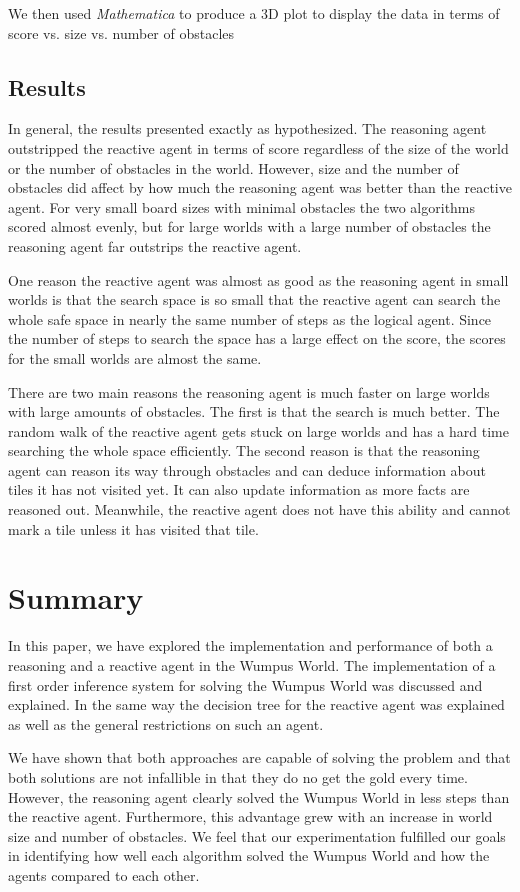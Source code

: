 \documentclass{article}
\begin{document}
	We then used \textit{Mathematica}  to produce a 3D plot to display the data in terms of score vs. size vs. number of obstacles
	
	\subsection{Results}
		In general, the results presented exactly as hypothesized. The reasoning agent outstripped the reactive agent in terms of score regardless of the size of the world or the number of obstacles in the world. 
		However, size and the number of obstacles did affect by how much the reasoning agent was better than the reactive agent. 
		For very small board sizes with minimal obstacles the two algorithms scored almost evenly, but for large worlds with a  large number of obstacles the reasoning agent far outstrips the reactive agent.
		
		One reason the reactive agent was almost as good as the reasoning agent in small worlds is that the search space is so small that the reactive agent can search the whole safe space in nearly the same number of steps as the logical agent.
	 Since the number of steps to search the space has a large effect on the score, the scores for the small worlds are almost the same. 
		
		There are two main reasons the reasoning agent is much faster on large worlds with large amounts of obstacles.
		 The first is that the search is much better.
		  The random walk of the reactive agent gets stuck on large worlds and has a hard time searching the whole space efficiently.
		   The second reason is that the reasoning agent can reason its way through obstacles and can deduce information about tiles it has not visited yet.
		    It can also update information as more facts are reasoned out.
		     Meanwhile, the reactive agent does not have this ability and cannot mark a tile unless it has visited that tile.
	
\section{Summary}
In this paper, we have explored the implementation and performance of both a reasoning and a reactive agent in the Wumpus World. The implementation of a first order inference system for solving the Wumpus World was discussed and explained. In the same way the decision tree for the reactive agent was explained as well as the general restrictions on such an agent.

We have shown that both approaches are capable of solving the problem and that both solutions are not infallible in that they do no get the gold every time. However, the reasoning agent clearly solved the Wumpus World in less steps than the reactive agent. Furthermore, this advantage grew with an increase in world size and number of obstacles. We feel that our experimentation fulfilled our goals in identifying how well each algorithm solved the Wumpus World and how the agents compared to each other.


	

	\pagebreak


	
	
	
\end{document}
